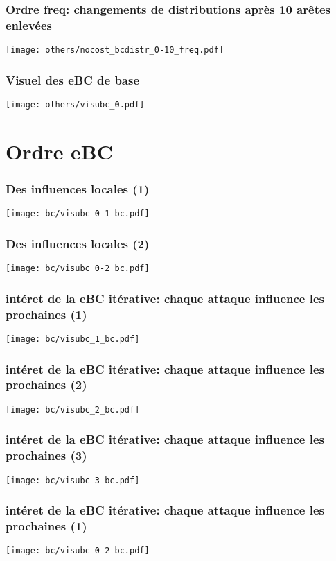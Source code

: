 \documentclass[aspectratio=169]{beamer}
\begin{document}
    \begin{frame}
        \frametitle{Ordre freq: changements de distributions après 10 arêtes enlevées}
        \centering
        \texttt{[image: others/nocost\_bcdistr\_0-10\_freq.pdf]}    
    \end{frame}

    \begin{frame}
        \frametitle{Visuel des eBC de base}
        \centering
        \texttt{[image: others/visubc\_0.pdf]}
    \end{frame}

    \section{Ordre eBC}

    \begin{frame}
        \frametitle{Des influences locales (1)}
        \texttt{[image: bc/visubc\_0-1\_bc.pdf]}
    \end{frame}

    \begin{frame}
        \frametitle{Des influences locales (2)}
        \texttt{[image: bc/visubc\_0-2\_bc.pdf]}
    \end{frame}

    \begin{frame}
        \centering
        \frametitle{intéret de la eBC itérative: chaque attaque influence les prochaines (1)}
        \texttt{[image: bc/visubc\_1\_bc.pdf]}
    \end{frame}

    \begin{frame}
        \centering
        \frametitle{intéret de la eBC itérative: chaque attaque influence les prochaines (2)}
        \texttt{[image: bc/visubc\_2\_bc.pdf]}
    \end{frame}

    \begin{frame}
        \centering
        \frametitle{intéret de la eBC itérative: chaque attaque influence les prochaines (3)}
        \texttt{[image: bc/visubc\_3\_bc.pdf]}
    \end{frame}

    \begin{frame}
        \centering
        \frametitle{intéret de la eBC itérative: chaque attaque influence les prochaines (1)}
        \texttt{[image: bc/visubc\_0-2\_bc.pdf]}
    \end{frame}
\end{document}
